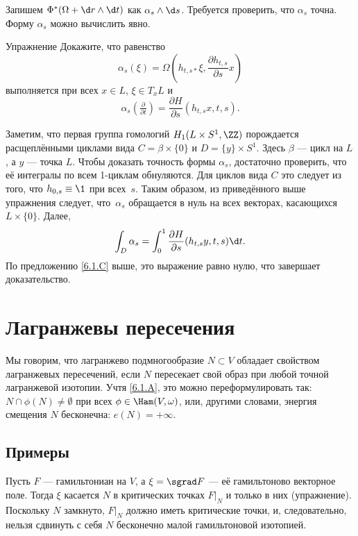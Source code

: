 Запишем $\Phi^\ast (\Omega + \d r \wedge \d t)$ как $\alpha_s \wedge \d s$.
Требуется проверить, что $\alpha_s$ точна.
Форму $\alpha_s$ можно вычислить явно.

\begin{thm*}{Упражнение}
Докажите, что равенство
\[\alpha_s (\xi) = \Omega (h_{t, s\ast} \xi, \frac{\partial h_{t, s}}{\partial s}x)\] 
выполняется при всех
$x \in L$, $\xi \in T_x L$ и 
\[\alpha_s (\tfrac{\partial}{\partial t}) = \frac{\partial H}{\partial s}(h_{t, s}x, t, s).\]
\end{thm*}

Заметим, что первая группа гомологий $H_1 (L \times S^1, \ZZ)$ порождается расщеплёнными циклами вида $C = \beta \times \{0\}$ и $D = \{y\} \times S^1$.
Здесь $\beta$ --- цикл на $L$, а $y$ --- точка $L$.
Чтобы доказать точность формы $\alpha_s$, достаточно проверить, что её интегралы по всем 1-циклам обнуляются.
Для циклов вида $C$ это следует из того, что $h_{0, s} \equiv \1$ при всех~$s$.
Таким образом, из приведённого выше упражнения следует, что~$\alpha_s$ обращается в нуль на всех векторах, касающихся $L \times \{0\}$.
Далее, 
\[\int_D \alpha_s
= \int_0^1 \frac{\partial H}{\partial s} (h_{t, s} y, t, s) \d t. 
\]
По предложению \ref{6.1.C} выше,
это выражение равно нулю, что завершает доказательство.
\qeds

\section{Лагранжевы пересечения}

Мы говорим, что лагранжево подмногообразие $N \subset V$ обладает свойством лагранжевых пересечений, если $N$ пересекает свой образ при любой точной лагранжевой изотопии.
Учтя \ref{6.1.A}, это можно переформулировать так: $N \cap \phi (N) \ne \emptyset$ при всех $\phi \in \Ham (V, \omega)$, или, другими словами, энергия смещения $N$ бесконечна: $e (N) = + \infty$.

\subsection*{Примеры} 

\begin{thm}{}
Пусть $F$ ---  гамильтониан на $V$, а $\xi = \sgrad F$ --- её гамильтоново векторное поле.
Тогда $\xi$ касается $N$ в критических точках $F|_N$ и только в них (упражнение).
Поскольку $N$ замкнуто, $F|_N$ должно иметь критические точки, и, следовательно, нельзя сдвинуть с себя $N$ бесконечно малой гамильтоновой изотопией.
\end{thm}


